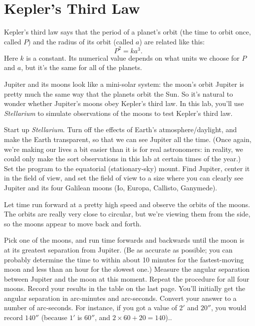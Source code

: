 \section{Kepler's Third Law}

\makelabheader

\answerspace{1in}

Kepler's third law says that the period of a planet's orbit
(the time to orbit once, called $P$) and the radius
of its orbit (called $a$) are related like this:
$$
P^2=ka^3.
$$
Here $k$ is a constant.  Its numerical value depends on what units
we choose for $P$ and $a$, but it's the same for all of the planets.

Jupiter and its moons look like a mini-solar system: the moon's orbit
Jupiter is pretty much the same way that the planets orbit the Sun.
So it's natural to wonder whether Jupiter's moons obey Kepler's third
law.  In this lab, you'll use 
{\it Stellarium} to simulate
observations of the moons to test Kepler's third law.

Start up \textit{Stellarium}. Turn off the effects of Earth's
atmosphere/daylight, and make the Earth transparent, so that we can see
Jupiter all the time. (Once again, we're making our lives a bit easier than
it is for real astronomers: in reality, we could only make
the sort observations in this lab at certain times of the year.)
Set the program to the equatorial (stationary-sky) mount.
Find Jupiter, center it in the field
of view, and set the field of view to a size where you can clearly 
see Jupiter and its four Galilean moons (Io, Europa, Callisto, Ganymede).

Let time run forward at a pretty high speed and observe the orbits of 
the moons.  The orbits are really very close to circular, but we're
viewing them from the side, so the moons appear to move back and forth.

Pick one of the moons, and run time forwards and backwards until the
moon is at its greatest separation from Jupiter.  (Be as accurate as
possible; you can probably determine the time to within about 10 minutes
for the fastest-moving moon and less than an hour for the slowest one.)
Measure the angular separation between Jupiter and the moon at this moment.
Repeat the procedure for all four moons.  Record your results in the table
on the last page.  You'll initially get the angular separation
in arc-minutes and arc-seconds.  Convert your answer to a number of 
arc-seconds.  For instance, if you got a value of $2'$ and $20''$, you
would record $140''$ (because $1'$ is $60''$, and $2\times 60+20=140$)..

